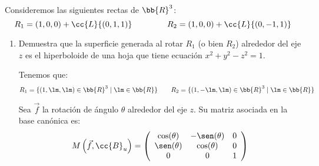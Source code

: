 \begin{ejercicio}
    Consideremos las siguientes rectas de $\bb{R}^3$:
    \begin{equation*}
        R_1 = (1, 0, 0) + \cc{L}\{(0, 1, 1)\}\hspace{1.5cm}
        R_2 = (1, 0, 0) + \cc{L}\{(0, -1, 1)\}
    \end{equation*}
    \begin{enumerate}
        \item  Demuestra que la superficie generada al rotar $R_1$ (o bien $R_2$) alrededor del eje $z$ es el hiperboloide de una hoja que tiene ecuación $x^2+y^2-z^2=1$.
        
        Tenemos que:
        \begin{equation*}
            R_1=\{(1,\lm,\lm)\in \bb{R}^3 \mid \lm\in \bb{R}\} \qquad R_2=\{(1,-\lm,\lm)\in \bb{R}^3 \mid \lm\in \bb{R}\}
        \end{equation*}

        Sea $\vec{f}$ la rotación de ángulo $\theta$ alrededor del eje $z$. Su matriz asociada en la base canónica es:
        \begin{equation*}
            M\left(\vec{f}, \cc{B}_u\right) = \left(\begin{array}{ccc}
                \cos(\theta) & -\sen(\theta) & 0\\ 
                \sen(\theta) & \cos(\theta) & 0 \\
                0 & 0 & 1
            \end{array}\right)
        \end{equation*}


\end{enumerate}
\end{ejercicio}
